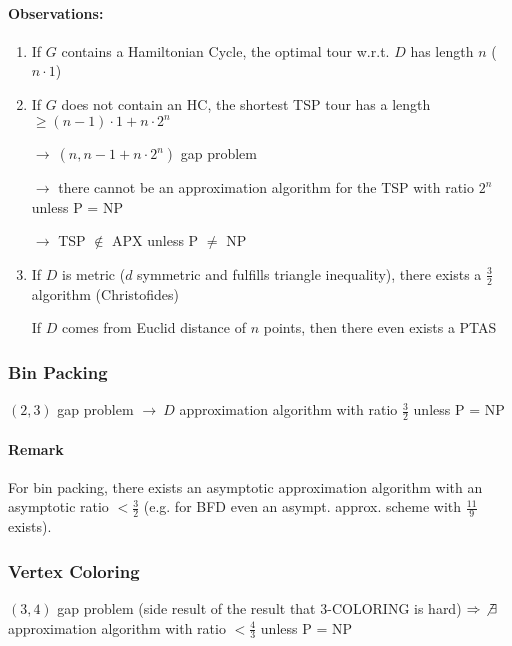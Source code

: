 \documentclass[11pt]{article}
\theoremstyle{definition}
\theoremstyle{definition}
\begin{document}
\paragraph{Observations:}
\begin{enumerate}
\item If $ G $ contains a Hamiltonian Cycle, the optimal tour w.r.t. $ D $ has length $ n $ ($ n \cdot 1$)
\item If $ G $ does not contain an HC, the shortest TSP tour has a length $ \geq (n - 1) \cdot 1  + n \cdot 2^n $

$ \rightarrow ~ (n, n-1 + n \cdot 2^n)$ gap problem

$ \rightarrow $ there cannot be an approximation algorithm for the TSP with ratio $ 2^n $ unless P = NP

$ \rightarrow $ TSP $ \not \in $ APX unless P $ \neq $ NP

\item If $ D $ is metric ($ d $ symmetric and fulfills triangle inequality), there exists a $ \frac{3}{2} $ algorithm (Christofides) \newline

If $ D $ comes from Euclid distance of $ n $ points, then there even exists a PTAS

\end{enumerate}


\subsubsection{Bin Packing}

$(2, 3)$ gap problem $ \rightarrow ~D $ approximation algorithm with ratio $ \frac{3}{2} $ unless P = NP

\paragraph{Remark} For bin packing, there exists an asymptotic approximation algorithm with an asymptotic ratio $ < \frac{3}{2} $ (e.g. for BFD even an asympt. approx. scheme with $ \frac{11}{9} $ exists).

\subsubsection{Vertex Coloring}

$(3, 4)$ gap problem (side result of the result that 3-COLORING is hard) $ \Rightarrow ~ \not \exists $ approximation algorithm with ratio $ < \frac{4}{3} $ unless P = NP
\end{document}
